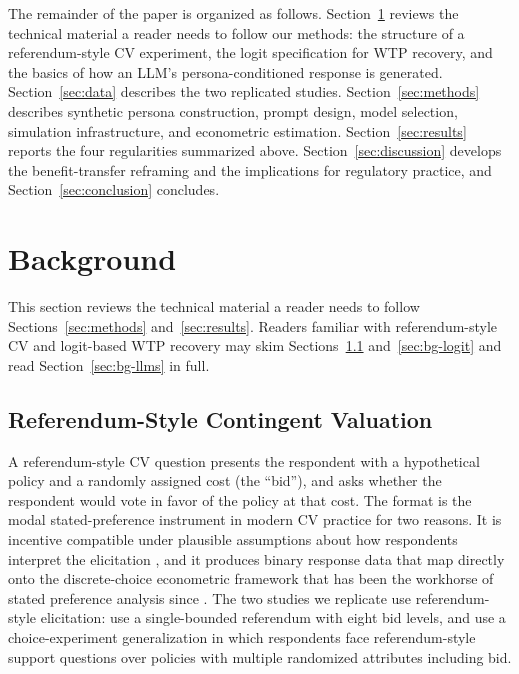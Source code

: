 \documentclass[12pt]{article}
\begin{document}
The remainder of the paper is organized as follows.
Section~\ref{sec:background} reviews the technical material a reader needs
to follow our methods: the structure of a referendum-style CV experiment,
the logit specification for WTP recovery, and the basics of how an LLM's
persona-conditioned response is generated. Section~\ref{sec:data} describes
the two replicated studies. Section~\ref{sec:methods} describes synthetic
persona construction, prompt design, model selection, simulation
infrastructure, and econometric estimation. Section~\ref{sec:results}
reports the four regularities summarized above. Section~\ref{sec:discussion}
develops the benefit-transfer reframing and the implications for regulatory
practice, and Section~\ref{sec:conclusion} concludes.

%

\section{Background}\label{sec:background}

This section reviews the technical material a reader needs to follow
Sections~\ref{sec:methods} and~\ref{sec:results}. Readers familiar with
referendum-style CV and logit-based WTP recovery may skim
Sections~\ref{sec:bg-cv} and~\ref{sec:bg-logit} and read
Section~\ref{sec:bg-llms} in full.

\subsection{Referendum-Style Contingent Valuation}\label{sec:bg-cv}

A referendum-style CV question presents the respondent with a hypothetical
policy and a randomly assigned cost (the ``bid''), and asks whether the
respondent would vote in favor of the policy at that cost. The format is
the modal stated-preference instrument in modern CV practice for two
reasons. It is incentive compatible under plausible assumptions about how
respondents interpret the elicitation \parencite{Carson2007}, and it
produces binary response data that map directly onto the discrete-choice
econometric framework that has been the workhorse of stated preference
analysis since \textcite{Hanemann1984}. The two studies we replicate use
referendum-style elicitation: \textcite{Aldy2012} use a single-bounded
referendum with eight bid levels, and \textcite{Giguere2020} use a
choice-experiment generalization in which respondents face referendum-style
support questions over policies with multiple randomized attributes
including bid.
\end{document}
